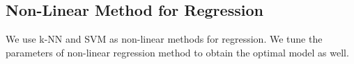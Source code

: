 









	\subsection{Non-Linear Method for Regression} %
	\label{sub:non_linear_estimator}
	We use \ac{k-NN} and \ac{SVM} as non-linear methods for regression. We tune the parameters of non-linear regression method to obtain the optimal model as well.

